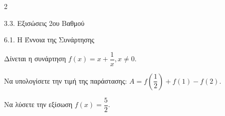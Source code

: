 \begin{ylh}{2}
    \item 3.3. Εξισώσεις 2ου Βαθμού
    \item 6.1. Η Έννοια της Συνάρτησης
\end{ylh}
Δίνεται η συνάρτηση $f(x) = x + \dfrac{1}{x},x \neq 0.$

\begin{alist}
\item Να υπολογίσετε την τιμή της παράστασης: $A = f\left( \dfrac{1}{2} \right) + f(1) - f(2).$
\item Να λύσετε την εξίσωση $f(x) = \dfrac{5}{2}.$
\end{alist}

